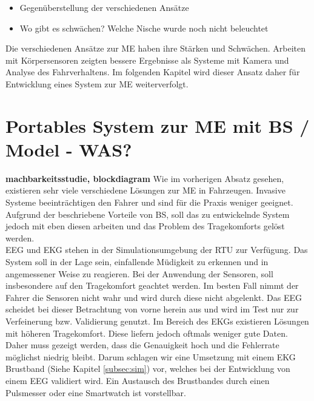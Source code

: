 {\begin{itemize}
  \item Gegenüberstellung der verschiedenen Ansätze
  \item Wo gibt es schwächen? Welche Nische wurde noch nicht beleuchtet
\end{itemize}

Die verschiedenen Ansätze zur \acl{ME} haben ihre Stärken und Schwächen. Arbeiten mit Körpersensoren zeigten bessere Ergebnisse als Systeme mit Kamera und Analyse des Fahrverhaltens. Im folgenden Kapitel wird dieser Ansatz daher für Entwicklung eines System zur \acl{ME} weiterverfolgt.

\section{Portables System zur \acl{ME} mit \acl{BS} / Model - WAS?}
\label{chap:prop}
\textbf{machbarkeitsstudie, blockdiagram}
Wie im vorherigen Absatz gesehen, existieren sehr viele verschiedene Lösungen zur \acl{ME} in Fahrzeugen. Invasive Systeme beeinträchtigen den Fahrer und sind für die Praxis weniger geeignet. Aufgrund der beschriebene Vorteile von \acl{BS}, soll das zu entwickelnde System jedoch mit eben diesen arbeiten und das Problem des Tragekomforts gelöst werden.\\

EEG und EKG stehen in der Simulationsumgebung der \acl{RTU} zur Verfügung. Das System soll in der Lage sein, einfallende Müdigkeit zu erkennen und in angemessener Weise zu reagieren. Bei der Anwendung der Sensoren, soll insbesondere auf den Tragekomfort geachtet werden. Im besten Fall nimmt der Fahrer die Sensoren nicht wahr und wird durch diese nicht abgelenkt. Das EEG scheidet bei dieser Betrachtung von vorne herein aus und wird im Test nur zur Verfeinerung bzw. Validierung genutzt. Im Bereich des EKGs existieren Lösungen mit höheren Tragekomfort. Diese liefern jedoch oftmals weniger gute Daten. Daher muss gezeigt werden, dass die Genauigkeit hoch und die Fehlerrate möglichst niedrig bleibt. 
Darum schlagen wir eine Umsetzung mit einem EKG Brustband (Siehe Kapitel \ref{subsec:sim}) vor, welches bei der Entwicklung von einem EEG validiert wird. Ein Austausch des Brustbandes durch einen Pulsmesser oder eine Smartwatch ist vorstellbar.\\

}

